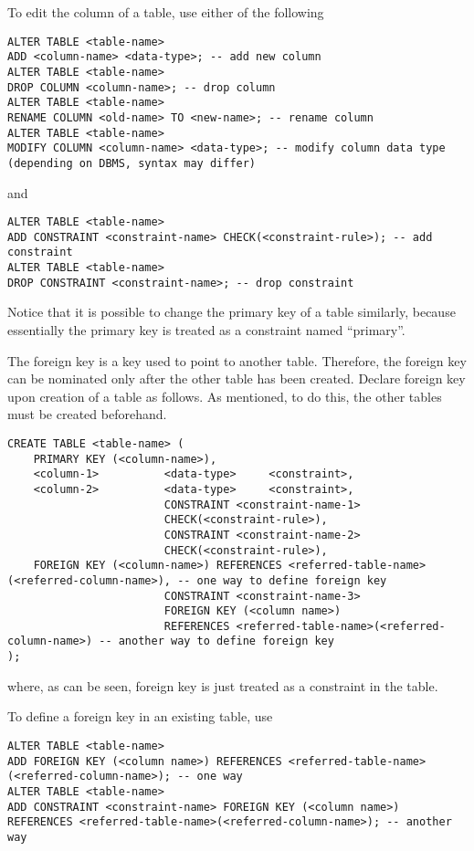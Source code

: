 To edit the column of a table, use either of the following
\begin{lstlisting}
ALTER TABLE <table-name>
ADD <column-name> <data-type>; -- add new column
ALTER TABLE <table-name>
DROP COLUMN <column-name>; -- drop column
ALTER TABLE <table-name>
RENAME COLUMN <old-name> TO <new-name>; -- rename column
ALTER TABLE <table-name>
MODIFY COLUMN <column-name> <data-type>; -- modify column data type (depending on DBMS, syntax may differ)
\end{lstlisting}
and
\begin{lstlisting}
ALTER TABLE <table-name>
ADD CONSTRAINT <constraint-name> CHECK(<constraint-rule>); -- add constraint
ALTER TABLE <table-name>
DROP CONSTRAINT <constraint-name>; -- drop constraint
\end{lstlisting}
Notice that it is possible to change the primary key of a table similarly, because essentially the primary key is treated as a constraint named ``primary''.

The foreign key is a key used to point to another table. Therefore, the foreign key can be nominated only after the other table has been created. Declare foreign key upon creation of a table as follows. As mentioned, to do this, the other tables must be created beforehand.
\begin{lstlisting}
CREATE TABLE <table-name> (
    PRIMARY KEY (<column-name>),
    <column-1>          <data-type>     <constraint>,
    <column-2>          <data-type>     <constraint>,
                        CONSTRAINT <constraint-name-1>
                        CHECK(<constraint-rule>),
                        CONSTRAINT <constraint-name-2>
                        CHECK(<constraint-rule>),
    FOREIGN KEY (<column-name>) REFERENCES <referred-table-name>(<referred-column-name>), -- one way to define foreign key
                        CONSTRAINT <constraint-name-3>
                        FOREIGN KEY (<column name>)
                        REFERENCES <referred-table-name>(<referred-column-name>) -- another way to define foreign key
);
\end{lstlisting}
where, as can be seen, foreign key is just treated as a constraint in the table.

To define a foreign key in an existing table, use
\begin{lstlisting}
ALTER TABLE <table-name>
ADD FOREIGN KEY (<column name>) REFERENCES <referred-table-name>(<referred-column-name>); -- one way
ALTER TABLE <table-name>
ADD CONSTRAINT <constraint-name> FOREIGN KEY (<column name>) REFERENCES <referred-table-name>(<referred-column-name>); -- another way
\end{lstlisting}


